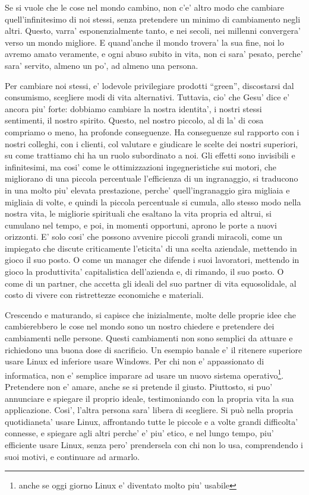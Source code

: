 Se si vuole che le cose nel mondo cambino, non c'e' altro modo che cambiare quell'infinitesimo di noi stessi, senza pretendere un minimo di cambiamento negli altri. Questo, varra' esponenzialmente tanto, e nei secoli, nei millenni convergera' verso un mondo migliore. E quand'anche il mondo trovera' la sua fine, noi lo avremo amato veramente, e ogni abuso subito in vita, non ci sara' pesato, perche' sara' servito, almeno un po', ad almeno una persona.

Per cambiare noi stessi, e' lodevole privilegiare prodotti ``green'', discostarsi dal consumismo, scegliere modi di vita alternativi. Tuttavia, cio' che Gesu' dice e' ancora piu' forte: dobbiamo cambiare la nostra identita', i nostri stessi sentimenti, il nostro spirito. Questo, nel nostro piccolo, al di la' di cosa compriamo o meno, ha profonde conseguenze. Ha conseguenze sul rapporto con i nostri colleghi, con i clienti, col valutare e giudicare le scelte dei nostri superiori, su come trattiamo chi ha un ruolo subordinato a noi. Gli effetti sono invisibili e infinitesimi, ma cosi' come le ottimizzazioni ingegneristiche sui motori, che migliorano di una piccola percentuale l'efficienza di un ingranaggio, si traducono in una molto piu' elevata prestazione, perche' quell'ingranaggio gira migliaia e migliaia di volte, e quindi la piccola percentuale si cumula, allo stesso modo nella nostra vita, le migliorie spirituali che esaltano la vita propria ed altrui, si cumulano nel tempo, e poi, in momenti opportuni, aprono le porte a nuovi orizzonti. E' solo cosi' che possono avvenire piccoli grandi miracoli, come un impiegato che discute criticamente l'eticita' di una scelta aziendale, mettendo in gioco il suo posto. O come un manager che difende i suoi lavoratori, mettendo in gioco la produttivita' capitalistica dell'azienda e, di rimando, il suo posto. O come di un partner, che accetta gli ideali del suo partner di vita equosolidale, al costo di vivere con ristrettezze economiche e materiali.

Crescendo e maturando, si capisce che inizialmente, molte delle proprie idee che cambierebbero le cose nel mondo sono un nostro chiedere e pretendere dei cambiamenti nelle persone. Questi cambiamenti non sono semplici da attuare e richiedono una buona dose di sacrificio. Un esempio banale e' il ritenere superiore usare Linux ed inferiore usare Windows. Per chi non e' appassionato di informatica, non e' semplice imparare ad usare un nuovo sistema operativo\footnote{anche se oggi giorno Linux e' diventato molto piu' usabile}.
Pretendere non e' amare, anche se si pretende il giusto. Piuttosto, si puo' annunciare e spiegare il proprio ideale, testimoniando con la propria vita la sua applicazione. Cosi', l'altra persona sara' libera di scegliere. Si può nella propria quotidianeta' usare Linux, affrontando tutte le piccole e a volte grandi difficolta' connesse, e spiegare agli altri perche' e' piu' etico, e nel lungo tempo, piu' efficiente usare Linux, senza pero' prendersela con chi non lo usa, comprendendo i suoi motivi, e continuare ad armarlo.

